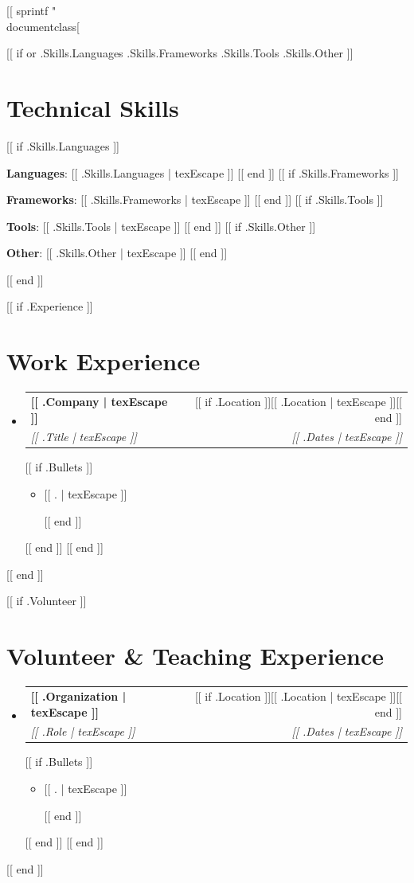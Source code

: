 [[ sprintf "\\documentclass[%
\makeatletter
\newcommand{\resumeItem}[1]{
  \item\small{
    {#1 \vspace{-2pt}}
  }
}
\newcommand{\resumeSubheading}[4]{
  \vspace{-1pt}\item
    \begin{tabular*}{0.97\textwidth}[t]{l@{\extracolsep{\fill}}r}
      \textbf{#1} & #2 \\
      \textit{\small#3} & \textit{\small #4} \\
    \end{tabular*}\vspace{-7pt}
}
\newcommand{\resumeSubHeadingListStart}{\begin{itemize}[leftmargin=0.15in, label={}]}
\newcommand{\resumeSubHeadingListEnd}{\end{itemize}}
\newcommand{\resumeItemListStart}{\begin{itemize}}
\newcommand{\resumeItemListEnd}{\end{itemize}\vspace{-5pt}}
\makeatother
\begin{document}
[[ if or .Skills.Languages .Skills.Frameworks .Skills.Tools .Skills.Other ]]
\section{Technical Skills}
 \begin{itemize}[leftmargin=0.15in, label={}]
    \small{
     [[ if .Skills.Languages ]]\item \textbf{Languages}{: [[ .Skills.Languages | texEscape ]]} [[ end ]]
     [[ if .Skills.Frameworks ]]\item \textbf{Frameworks}{: [[ .Skills.Frameworks | texEscape ]]} [[ end ]]
     [[ if .Skills.Tools ]]\item \textbf{Tools}{: [[ .Skills.Tools | texEscape ]]} [[ end ]]
     [[ if .Skills.Other ]]\item \textbf{Other}{: [[ .Skills.Other | texEscape ]]} [[ end ]]
    }
 \end{itemize}
[[ end ]]



[[ if .Experience ]]
\section{Work Experience}
  \resumeSubHeadingListStart
    [[ range .Experience ]]
    \resumeSubheading
      {[[ .Company | texEscape ]]}{[[ if .Location ]][[ .Location | texEscape ]][[ end ]]}
      {[[ .Title | texEscape ]]}{[[ .Dates | texEscape ]]}
      [[ if .Bullets ]]
      \resumeItemListStart
        [[ range texLines .Bullets ]]\resumeItem{[[ . | texEscape ]]}
        [[ end ]]
      \resumeItemListEnd
      [[ end ]]
    [[ end ]]
  \resumeSubHeadingListEnd
[[ end ]]

[[ if .Volunteer ]]
\section{Volunteer \& Teaching Experience}
  \resumeSubHeadingListStart
    [[ range .Volunteer ]]
    \resumeSubheading
      {[[ .Organization | texEscape ]]}{[[ if .Location ]][[ .Location | texEscape ]][[ end ]]}
      {[[ .Role | texEscape ]]}{[[ .Dates | texEscape ]]}
      [[ if .Bullets ]]
      \resumeItemListStart
        [[ range texLines .Bullets ]]\resumeItem{[[ . | texEscape ]]}
        [[ end ]]
      \resumeItemListEnd
      [[ end ]]
    [[ end ]]
  \resumeSubHeadingListEnd
[[ end ]]
\end{document}
